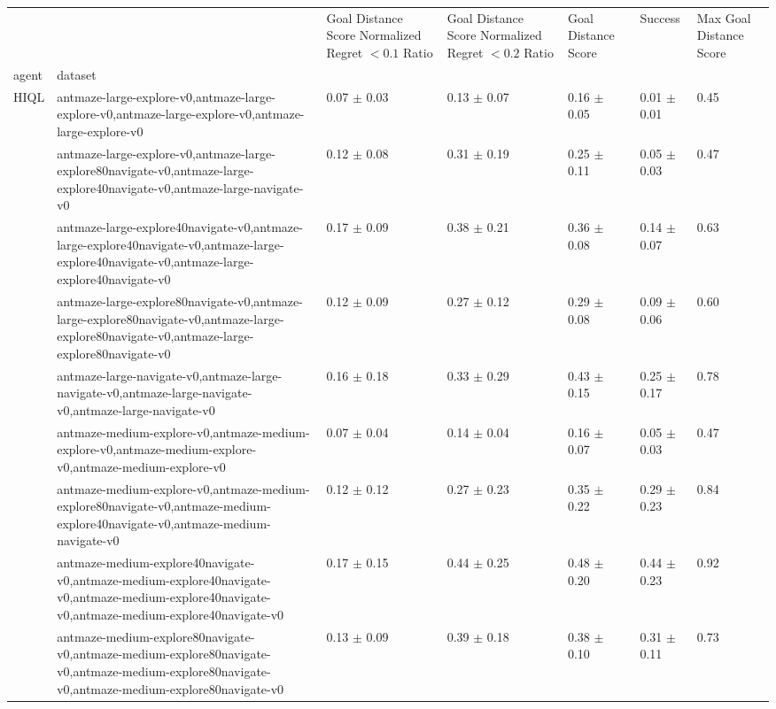 \begin{tabular}{lllllll}
\toprule
 &  & Goal Distance Score Normalized Regret $< 0.1$ Ratio & Goal Distance Score Normalized Regret $< 0.2$ Ratio & Goal Distance Score & Success & Max Goal Distance Score \\
agent & dataset &  &  &  &  &  \\
\midrule
\multirow[t]{10}{*}{HIQL} & antmaze-large-explore-v0,antmaze-large-explore-v0,antmaze-large-explore-v0,antmaze-large-explore-v0 & 0.07 $\pm$ 0.03 & 0.13 $\pm$ 0.07 & 0.16 $\pm$ 0.05 & 0.01 $\pm$ 0.01 & 0.45 \\
 & antmaze-large-explore-v0,antmaze-large-explore80navigate-v0,antmaze-large-explore40navigate-v0,antmaze-large-navigate-v0 & 0.12 $\pm$ 0.08 & 0.31 $\pm$ 0.19 & 0.25 $\pm$ 0.11 & 0.05 $\pm$ 0.03 & 0.47 \\
 & antmaze-large-explore40navigate-v0,antmaze-large-explore40navigate-v0,antmaze-large-explore40navigate-v0,antmaze-large-explore40navigate-v0 & 0.17 $\pm$ 0.09 & 0.38 $\pm$ 0.21 & 0.36 $\pm$ 0.08 & 0.14 $\pm$ 0.07 & 0.63 \\
 & antmaze-large-explore80navigate-v0,antmaze-large-explore80navigate-v0,antmaze-large-explore80navigate-v0,antmaze-large-explore80navigate-v0 & 0.12 $\pm$ 0.09 & 0.27 $\pm$ 0.12 & 0.29 $\pm$ 0.08 & 0.09 $\pm$ 0.06 & 0.60 \\
 & antmaze-large-navigate-v0,antmaze-large-navigate-v0,antmaze-large-navigate-v0,antmaze-large-navigate-v0 & 0.16 $\pm$ 0.18 & 0.33 $\pm$ 0.29 & 0.43 $\pm$ 0.15 & 0.25 $\pm$ 0.17 & 0.78 \\
 & antmaze-medium-explore-v0,antmaze-medium-explore-v0,antmaze-medium-explore-v0,antmaze-medium-explore-v0 & 0.07 $\pm$ 0.04 & 0.14 $\pm$ 0.04 & 0.16 $\pm$ 0.07 & 0.05 $\pm$ 0.03 & 0.47 \\
 & antmaze-medium-explore-v0,antmaze-medium-explore80navigate-v0,antmaze-medium-explore40navigate-v0,antmaze-medium-navigate-v0 & 0.12 $\pm$ 0.12 & 0.27 $\pm$ 0.23 & 0.35 $\pm$ 0.22 & 0.29 $\pm$ 0.23 & 0.84 \\
 & antmaze-medium-explore40navigate-v0,antmaze-medium-explore40navigate-v0,antmaze-medium-explore40navigate-v0,antmaze-medium-explore40navigate-v0 & 0.17 $\pm$ 0.15 & 0.44 $\pm$ 0.25 & 0.48 $\pm$ 0.20 & 0.44 $\pm$ 0.23 & 0.92 \\
 & antmaze-medium-explore80navigate-v0,antmaze-medium-explore80navigate-v0,antmaze-medium-explore80navigate-v0,antmaze-medium-explore80navigate-v0 & 0.13 $\pm$ 0.09 & 0.39 $\pm$ 0.18 & 0.38 $\pm$ 0.10 & 0.31 $\pm$ 0.11 & 0.73 \\

\end{tabular}
